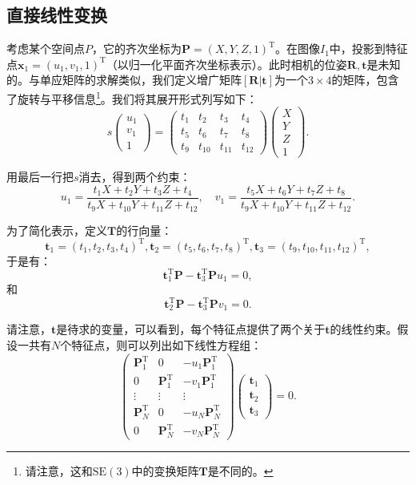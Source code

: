 \subsection{直接线性变换}
考虑某个空间点$P$，它的齐次坐标为${\bm{P}}=(X,Y,Z,1)^{\mathrm{T}}$。在图像$I_{1}$中，投影到特征点${\bm{x}}_{1}=(u_{1},v_{1},1)^{\mathrm{T}}$（以归一化平面齐次坐标表示）。此时相机的位姿$\bm{R}, \bm{t}$是未知的。与单应矩阵的求解类似，我们定义增广矩阵$[\bm{R}|\bm{t}]$为一个$3\times 4$的矩阵，包含了旋转与平移信息\footnote{请注意，这和$\mathrm{SE}(3)$中的变换矩阵$\bm{T}$是不同的。}。我们将其展开形式列写如下：
\begin{equation}
s
\begin{pmatrix}
u_{1} \\ v_{1} \\ 1
\end{pmatrix}
=
\begin{pmatrix}
t_{1} & t_{2} & t_{3} & t_{4}\\ 
t_{5} & t_{6} & t_{7} & t_{8}\\ 
t_{9} & t_{10} & t_{11} & t_{12}
\end{pmatrix}
\begin{pmatrix}
X \\ Y \\ Z \\ 1
\end{pmatrix}.
\end{equation}

用最后一行把$s$消去，得到两个约束：
\[
u_{1}=\frac{t_{1}X+t_{2}Y+t_{3}Z+t_{4}}{t_{9}X+t_{10}Y+t_{11}Z+t_{12}},\quad
v_{1}=\frac{t_{5}X+t_{6}Y+t_{7}Z+t_{8}}{t_{9}X+t_{10}Y+t_{11}Z+t_{12}}.
\]

为了简化表示，定义$\bm{T}$的行向量：
\[
\bm{t}_{1}=(t_{1},t_{2},t_{3},t_{4})^\mathrm{T},
\bm{t}_{2}=(t_{5},t_{6},t_{7},t_{8})^\mathrm{T},
\bm{t}_{3}=(t_{9},t_{10},t_{11},t_{12})^\mathrm{T},
\]
于是有：
\[
\bm{t}_1^\mathrm{T}\bm{P}-\bm{t}_3^\mathrm{T}\bm{P} u_1=0,
\]
和
\[
\bm{t}_2^\mathrm{T}\bm{P}-\bm{t}_3^\mathrm{T}\bm{P} v_1=0.
\]

请注意，$\bm{t}$是待求的变量，可以看到，每个特征点提供了两个关于$\bm{t}$的线性约束。假设一共有$N$个特征点，则可以列出如下线性方程组：
\clearpage
\begin{equation}
\begin{pmatrix}
\bm{P}_{1}^{\mathrm{T}} & 0 & -u_{1}\bm{P}_{1}^{\mathrm{T}}	\\
0 & \bm{P}_{1}^{\mathrm{T}} & -v_{1}\bm{P}_{1}^{\mathrm{T}}	\\
\vdots & \vdots & \vdots			\\
\bm{P}_{N}^{\mathrm{T}} & 0 & -u_{N}\bm{P}_{N}^{\mathrm{T}} \\
0 & \bm{P}_{N}^{\mathrm{T}} & -v_{N}\bm{P}_{N}^{\mathrm{T}}
\end{pmatrix}
\begin{pmatrix}
\bm{t}_{1} \\ \bm{t}_{2} \\ \bm{t}_{3}
\end{pmatrix}
=0.
\end{equation}

